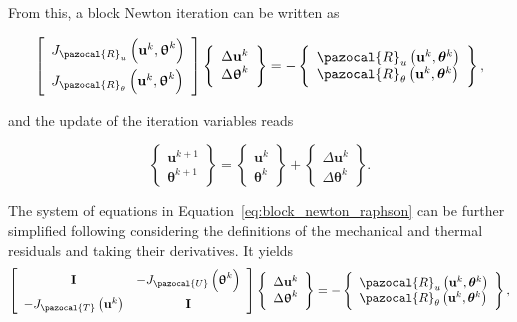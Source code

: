 From this, a block Newton iteration can be written as
\begin{highlight}
  \begin{equation} \label{eq:block_newton_raphson}
  \left[\begin{array}{l}
  J_{\pazocal{R}_{u}}\left(\mathbf u^k, \bm{\uptheta}^{k}\right) \\[7pt] J_{\pazocal{R}_{\theta}}\left(\mathbf{u}^{k}, \bm\uptheta^k\right)
  \end{array}\right]
  \left\{\begin{array}{c}\Delta \mathbf{u}^{k} \\ \Delta \bm{\uptheta}^{k}\end{array}\right\}
  =-\left\{\begin{array}{l}\pazocal{R}_{u}\left(\mathbf{u}^{k}, \boldsymbol{\theta}^{k}\right) \\ \pazocal{R}_{\theta}\left(\mathbf{u}^{k}, \boldsymbol{\theta}^{k}\right)\end{array}\right\},
  \end{equation}
\end{highlight}
and the update of the iteration variables reads
\begin{highlight}
  \begin{equation}
  \left\{\begin{array}{l}
  \mathbf{u}^{k+1} \\
  \boldsymbol{\theta}^{k+1}
  \end{array}\right\}=\left\{\begin{array}{l}
  \mathbf{u}^{k} \\
  \boldsymbol{\theta}^{k}
  \end{array}\right\}+\left\{\begin{array}{c}
  \Delta \mathbf{u}^{k} \\
  \Delta \boldsymbol{\theta}^{k}
  \end{array}\right\}.
  \end{equation}
\end{highlight}


The system of equations in Equation~\eqref{eq:block_newton_raphson} can be further simplified following \cite{degroote_development_2010} considering the definitions of the mechanical and thermal residuals and taking their derivatives.
It yields
\begin{equation}
\left[\begin{array}{cc}
\mathbf I & -J_{\pazocal{U}}\left(\bm{\uptheta}^{k}\right) \\[7pt]
-J_{\pazocal{T}}\left(\mathbf{u}^{k}\right) & \mathbf I
\end{array}\right]
\left\{\begin{array}{c}\Delta \mathbf{u}^{k} \\ \Delta \bm{\uptheta}^{k}\end{array}\right\}
=-\left\{\begin{array}{l}\pazocal{R}_{u}\left(\mathbf{u}^{k}, \boldsymbol{\theta}^{k}\right) \\ \pazocal{R}_{\theta}\left(\mathbf{u}^{k}, \boldsymbol{\theta}^{k}\right)\end{array}\right\},
\end{equation}

